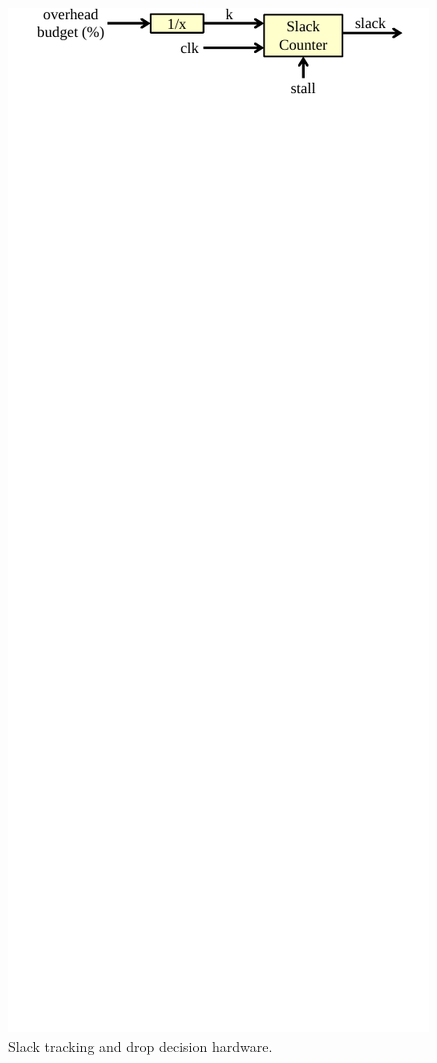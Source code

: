 \begin{figure}
  \begin{center}
    \includegraphics[width=\columnwidth]{figs/stm.pdf}
    \vspace{-0.2in}
    \caption{Slack tracking and drop decision hardware.}
    \label{fig:policies.stm}
    \vspace{-0.1in}
  \end{center}
\end{figure}

